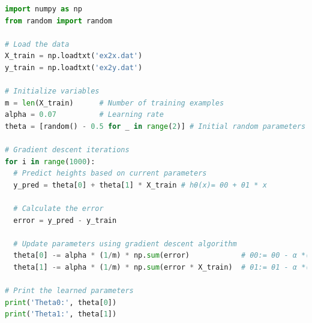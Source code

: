 \documentclass{article}
\begin{document}
    \begin{lstlisting}[language=Python, caption={Regresión lineal utilizando descenso de gradiente},label={lst:GradientDescent}]
import numpy as np
from random import random

# Load the data
X_train = np.loadtxt('ex2x.dat')
y_train = np.loadtxt('ex2y.dat')

# Initialize variables
m = len(X_train)      # Number of training examples
alpha = 0.07          # Learning rate
theta = [random() - 0.5 for _ in range(2)] # Initial random parameters

# Gradient descent iterations
for i in range(1000):
  # Predict heights based on current parameters
  y_pred = theta[0] + theta[1] * X_train # hθ(x)= θ0 + θ1 * x

  # Calculate the error
  error = y_pred - y_train

  # Update parameters using gradient descent algorithm
  theta[0] -= alpha * (1/m) * np.sum(error)            # θ0:= θ0 - α *(1/m) ∑ [hθ(xi) - yi]
  theta[1] -= alpha * (1/m) * np.sum(error * X_train)  # θ1:= θ1 - α *(1/m) ∑ [hθ(xi) - yi]*xi

# Print the learned parameters
print('Theta0:', theta[0])
print('Theta1:', theta[1])
    \end{lstlisting}
\end{document}
